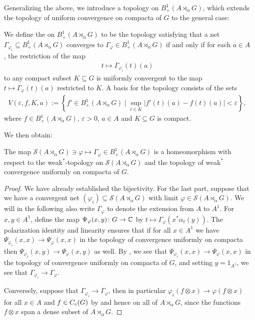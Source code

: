 Generalizing the above, we introduce a topology on $B_+^1(A \rtimes_\alpha G)$, which extends the topology of uniform convergence on compacta of $G$ to the general case:
\begin{definition}
We define the  on $B_+^1(A \rtimes_\alpha G)$ to be the topology satisfying that a net $\Gamma_{\varphi_i} \subseteq B_+^1(A \rtimes_\alpha G)$ converges to $\Gamma_{\varphi} \in B_+^1(A \rtimes_\alpha G)$ if and only if for each $a \in A$, the restriction of the map
\begin{align*}
	t \mapsto \Gamma_{\varphi_i}(t)(a)
\end{align*}
to any compact subset $K \subseteq G$ is uniformly convergent to the map $t \mapsto \Gamma_\varphi(t)(a)$ restricted to $K$. A basis for the topology consists of the sets
\begin{align*}
	V(\varepsilon, f, K, a) :=\left\{ f' \in B_+^1(A \rtimes_\alpha G) \mid \sup_{t \in K}| f'(t)(a) - f(t)(a) | < \varepsilon \right\},
\end{align*}
where $f \in B_{+}^1(A \rtimes_\alpha G)$, $\varepsilon > 0$, $a \in A$ and $K \subseteq G$ is compact.
\end{definition}

We then obtain:
\begin{proposition}
The map $\mathcal{S}(A \rtimes_\alpha G) \ni \varphi \mapsto \Gamma_\varphi \in B_+^1(A \rtimes_\alpha G)$ is a homeomorphism with respect to the weak$^*$-topology on $\mathcal{S}(A \rtimes_\alpha G)$ and the topology of weak$^*$ convergence uniformly on compacta of $G$.	
\end{proposition}
\begin{proof}
We have already established the bijectivity. For the last part, suppose that we have a convergent net $(\varphi_i) \subseteq \mathcal{S}(A \rtimes _\alpha  G)$	with limit $\varphi \in \mathcal{S}(A \rtimes_\alpha G)$. We will in the following also write $\Gamma_\varphi$ to denote the extension from $A$ to $A^1$. For $x,y \in A^1$, define the map $\Psi_{\varphi}(x,y) \colon G \to \mathbb{C}$ by $t \mapsto \Gamma_\varphi(x^* \alpha_t(y))$. The polarization identity and linearity ensures that if for all $x \in A^1$ we have $\Psi_{\varphi_i}(x,x) \to \Psi_{\varphi}(x,x)$ in the topology of convergence uniformly on compacta then $\Psi_{\varphi_i}(x,y) \to \Psi_{\varphi}(x,y)$ as well. By , we see that $\Psi_{\varphi_i}(x,x) \to \Psi_{\varphi}(x,x)$ in the topology of convergence uniformly on compacta of $G$, and setting $y = 1_{A^1}$, we see that $\Gamma_{\varphi_i} \to \Gamma_\varphi$.

Conversely, suppose that $\Gamma_{\varphi_i} \to \Gamma_{\varphi}$, then in particular $\varphi_{i}(f \otimes x) \to \varphi(f \otimes x)$ for all $x \in A$ and $f \in C_c(G)$ by  and hence on all of $A \rtimes_\alpha G$, since the functions $f \otimes x$ span a dense subset of $A \rtimes_\alpha G$.
\end{proof}

